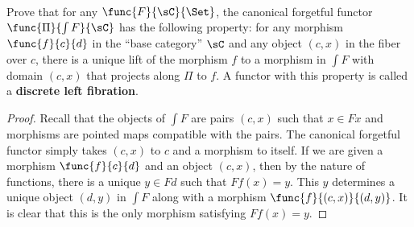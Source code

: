 \documentclass[main.tex]{subfiles}
\begin{document}
\maketitle

\paragraph{}
\begin{exercise}
	Prove that for any \(\func{F}{\sC}{\Set}\), the canonical forgetful functor
	\(\func{\Pi}{\int F}{\sC}\) has the following property: for any morphism
	\(\func{f}{c}{d}\) in the ``base category'' \(\sC\) and any object \((c,x)\)
	in the fiber over \(c\), there is a unique lift of the morphism \(f\) to a
	morphism in \(\int F\) with domain \((c,x)\) that projects along \(\Pi\) to
	\(f\). A functor with this property is called a \textbf{discrete left
	fibration}.
\end{exercise}

\begin{proof}
	Recall that the objects of \(\int F\) are pairs \((c,x)\) such that
	\(x\in Fx\) and morphisms are pointed maps compatible with the pairs. The
	canonical forgetful functor simply takes \((c,x)\) to \(c\) and a morphism
	to itself. If we are given a morphism \(\func{f}{c}{d}\) and an object
	\((c,x)\), then by the nature of functions, there is a unique \(y\in Fd\)
	such that \(Ff(x)=y\). This \(y\) determines a unique object \((d,y)\) in
	\(\int F\) along with a morphism \(\func{f}{(c,x)}{(d,y)}\). It is clear
	that this is the only morphism satisfying \(Ff(x)=y\).
\end{proof}
\end{document}
